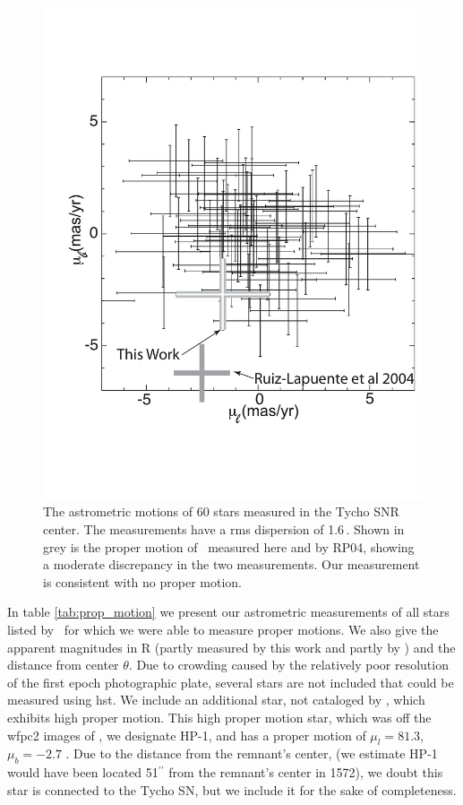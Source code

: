 \begin{figure}[h!]
	\centering
	\includegraphics[width=\textwidth]{chapter_sn1572_starg/plots/prop_motion_compare_subaru.pdf}
\caption[Proper motion measurements for stars in SN 1572 from plates and HST images]{The astrometric motions of 60 stars measured in the Tycho SNR
center. The measurements have a \gls{rms} dispersion of 1.6\,\masyr. Shown
in grey is the proper motion of \starg\ measured here and by RP04, showing a moderate discrepancy in the two measurements. Our measurement is consistent with no proper motion. }
\label{fig:prop_motion}
\end{figure}

In table \ref{tab:prop_motion} we present our astrometric measurements of all stars listed by \rl\  for which we were able to measure proper motions. We also give the apparent magnitudes in R (partly measured by this work and partly by \rl) and the distance from center $\theta$. Due to crowding caused by the relatively poor resolution of the first epoch photographic plate, several stars are not included that could be measured using \gls{hst}.
We include an  additional star, not cataloged by \rl, which exhibits high proper motion. This  high proper motion star, which was off the \gls{wfpc2} images of \rl,  we designate HP-1, and has a proper motion of $\mu_l=81.3$, $\mu_b=-2.7$ \masyr. Due to the distance from the remnant's center, (we estimate HP-1 would have been located 51$^{\prime\prime}$ from the remnant's center in 1572), we doubt this star is connected to the Tycho SN, but we include it for the sake of completeness. 

